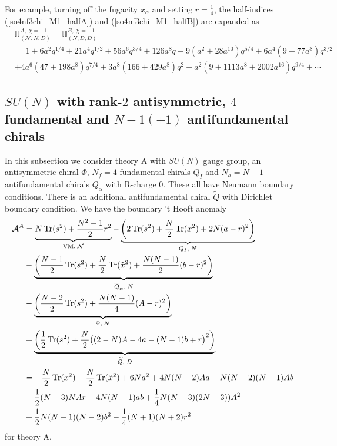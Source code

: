 \documentclass[12pt]{article}
\newcommand{\Acal}{\mathcal{A}}
\newcommand{\Ncal}{\mathcal{N}}
\DeclareMathOperator*{\Tr}{{\rm Tr}}
\numberwithin{equation}{section}
\begin{document}
For example, turning off the fugacity $x_{\alpha}$ and setting $r=\frac14$, 
the half-indices (\ref{so4nf3chi_M1_halfA}) and (\ref{so4nf3chi_M1_halfB}) are expanded as 
\begin{align}
&\mathbb{II}_{(\mathcal{N},N,D)}^{A, \; \chi = -1}
=
\mathbb{II}_{(N,D,D)}^{B, \; \chi = -1}
\nonumber\\
&=1+6a^2q^{1/4}+21a^4q^{1/2}+56a^6q^{3/4}
+126a^8q+9(a^2+28a^{10})q^{5/4}
+6a^4(9+77a^8)q^{3/2}
\nonumber\\
&+4a^6(47+198a^8)q^{7/4}
+3a^8(166+429a^8)q^2
+a^2(9+1113a^8+2002a^{16})q^{9/4}+\cdots
\end{align}

\subsection{$SU(N)$ with rank-$2$ antisymmetric, $4$ fundamental and $N-1 (+ 1)$ antifundamental chirals}
\label{sec_New_SUN_integral_AS}
In this subsection we consider theory A with $SU(N)$ gauge group, 
an antisymmetric chiral $\Phi$, $N_f = 4$ fundamental chirals $Q_{I}$ and $N_a = N - 1$ antifundamental chirals $\overline{Q}_{\alpha}$ with R-charge $0$. 
These all have Neumann boundary conditions. 
There is an additional antifundamental chiral $\widetilde{Q}$ with Dirichlet boundary condition. 
We have the boundary 't Hooft anomaly 
\begin{align}
\label{bdy_SUN_AS_4_Nm1_anomA}
\Acal^A & = \underbrace{N\Tr(s^2) + \frac{N^2 - 1}{2}r^2}_{\textrm{VM}, \; \Ncal}
 - \underbrace{\left( 2\Tr(s^2) + \frac{N}{2}\Tr(x^2) + 2N(a-r)^2 \right)}_{Q_I, \; N}
  \nonumber \\
 & - \underbrace{\left( \frac{N-1}{2}\Tr(s^2) + \frac{N}{2}\Tr(\tilde{x}^2) + \frac{N(N-1)}{2}(b-r)^2 \right)}_{\overline{Q}_{\alpha}, \; N}
  \nonumber \\
 & - \underbrace{\left( \frac{N-2}{2}\Tr(s^2) + \frac{N(N-1)}{4}(A - r)^2 \right)}_{\Phi, \; \Ncal}
  \nonumber \\
 & + \underbrace{\left( \frac{1}{2}\Tr(s^2) + \frac{N}{2}\big( (2 - N)A - 4a - (N-1)b + r \big)^2 \right)}_{\widetilde{Q}, \; D}
  \nonumber \\
  &=  - \frac{N}{2} \Tr(x^2) - \frac{N}{2} \Tr(\tilde{x}^2) + 6N a^2 + 4N(N-2) Aa + N(N-2) (N-1) Ab
  \nonumber \\
  & - \frac{1}{2} (N-3) N Ar + 4N (N-1) ab + \frac{1}{4} N(N-3)(2N-3))A^2
  \nonumber \\
  & + \frac{1}{2} N (N-1)(N-2)b^2 - \frac{1}{4} (N+1)(N+2) r^2
\end{align}
for theory A.
 
\end{document}
